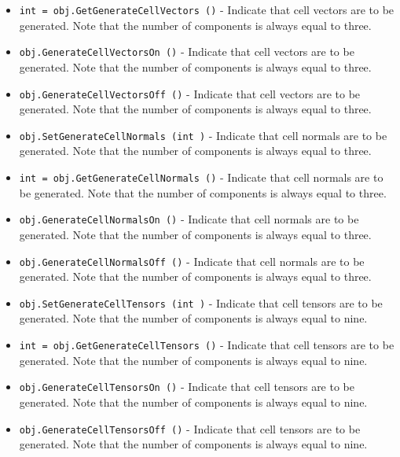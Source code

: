 \begin{itemize}
\item  \verb|int = obj.GetGenerateCellVectors ()| -  Indicate that cell vectors are to be generated. Note that the 
 number of components is always equal to three.

\item  \verb|obj.GenerateCellVectorsOn ()| -  Indicate that cell vectors are to be generated. Note that the 
 number of components is always equal to three.

\item  \verb|obj.GenerateCellVectorsOff ()| -  Indicate that cell vectors are to be generated. Note that the 
 number of components is always equal to three.

\item  \verb|obj.SetGenerateCellNormals (int )| -  Indicate that cell normals are to be generated. Note that the
 number of components is always equal to three.

\item  \verb|int = obj.GetGenerateCellNormals ()| -  Indicate that cell normals are to be generated. Note that the
 number of components is always equal to three.

\item  \verb|obj.GenerateCellNormalsOn ()| -  Indicate that cell normals are to be generated. Note that the
 number of components is always equal to three.

\item  \verb|obj.GenerateCellNormalsOff ()| -  Indicate that cell normals are to be generated. Note that the
 number of components is always equal to three.

\item  \verb|obj.SetGenerateCellTensors (int )| -  Indicate that cell tensors are to be generated. Note that the
 number of components is always equal to nine.

\item  \verb|int = obj.GetGenerateCellTensors ()| -  Indicate that cell tensors are to be generated. Note that the
 number of components is always equal to nine.

\item  \verb|obj.GenerateCellTensorsOn ()| -  Indicate that cell tensors are to be generated. Note that the
 number of components is always equal to nine.

\item  \verb|obj.GenerateCellTensorsOff ()| -  Indicate that cell tensors are to be generated. Note that the
 number of components is always equal to nine.


\end{itemize}
